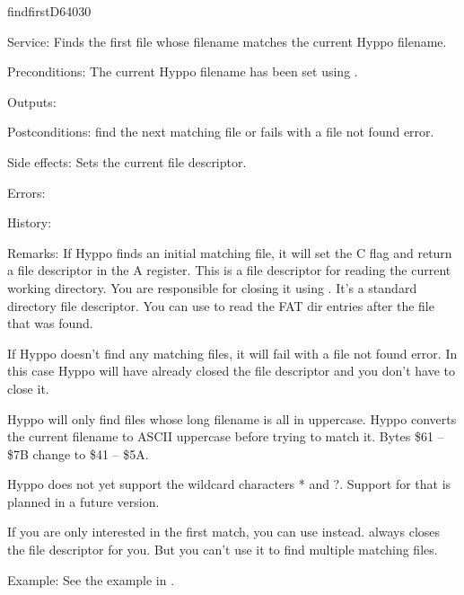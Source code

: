%
\newpage
\begin{hyppotrap}{findfirst}{D640}{30}
\item [Service:]
  Finds the first file whose filename matches the current Hyppo filename.
\item [Preconditions:]
  The current Hyppo filename has been set using .
\item [Outputs:]
\item [Postconditions:]
   find the next matching file or fails with a file not
  found error.
\item [Side effects:]
  Sets the current file descriptor.
\item [Errors:]
\item [History:]
\item [Remarks:]
  If Hyppo finds an initial matching file, it will set the C flag and
  return a file descriptor in the A register. This is a file descriptor for
  reading the current working directory. You are responsible for closing it
  using . It's a standard directory file descriptor. You
  can use  to read the FAT dir entries after the file that
  was found.

  If Hyppo doesn't find any matching files, it will fail with a file
  not found error. In this case Hyppo will have already closed the
  file descriptor and you don't have to close it.

  Hyppo will only find files whose long filename is all in uppercase.
  Hyppo converts the current filename to ASCII uppercase before trying
  to match it. Bytes \$61 -- \$7B change to \$41 -- \$5A.

  Hyppo does not yet support the wildcard characters * and ?. Support
  for that is planned in a future version.

  If you are only interested in the first match, you can use 
  instead.  always closes the file descriptor for you. But
  you can't use it to find multiple matching files.
\item [Example:]
  See the example in .
\end{hyppotrap}


